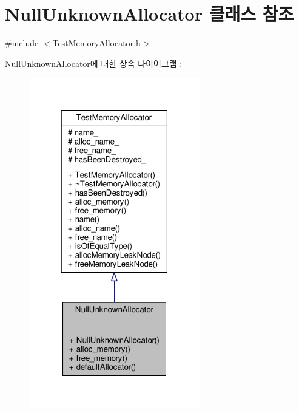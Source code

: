 \hypertarget{class_null_unknown_allocator}{}\section{Null\+Unknown\+Allocator 클래스 참조}
\label{class_null_unknown_allocator}


{\ttfamily \#include $<$Test\+Memory\+Allocator.\+h$>$}



Null\+Unknown\+Allocator에 대한 상속 다이어그램 \+: 
\nopagebreak
\begin{figure}[H]
\begin{center}
\leavevmode
\includegraphics[width=211pt]{class_null_unknown_allocator__inherit__graph}
\end{center}
\end{figure}


